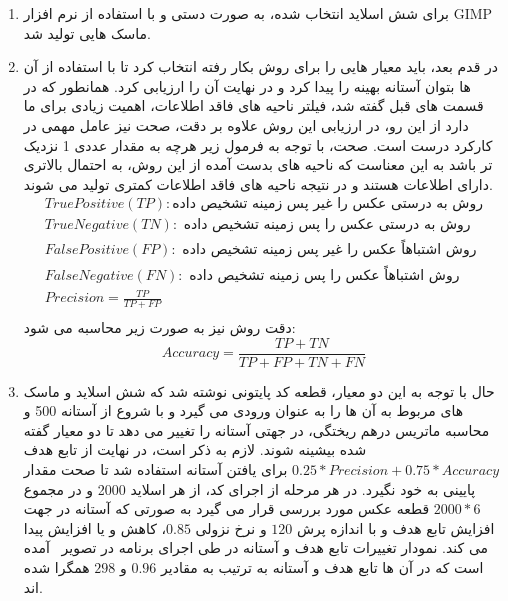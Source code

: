 \begin{enumerate}
    \item برای شش اسلاید انتخاب شده، به صورت دستی و با استفاده از نرم افزار GIMP ماسک هایی تولید شد.
    \item در قدم بعد، باید معیار هایی را برای روش بکار رفته انتخاب کرد تا با استفاده از آن ها بتوان آستانه بهینه را پیدا کرد و در نهایت آن را ارزیابی کرد.
    همانطور که در قسمت های قبل گفته شد، فیلتر ناحیه های فاقد اطلاعات، اهمیت زیادی برای ما دارد از این رو، در ارزیابی این روش علاوه بر دقت، صحت نیز عامل مهمی در کارکرد درست است.
    صحت، با توجه به فرمول زیر هرچه به مقدار عددی 1 نزدیک تر باشد به این معناست که ناحیه های بدست آمده از این روش، به احتمال بالاتری دارای اطلاعات هستند و در نتیجه ناحیه های فاقد اطلاعات کمتری تولید می شوند.
    \begin{gather*}
        TruePositive(TP) :\textit{روش به درستی عکس را غیر پس زمینه تشخیص داده}\\
        TrueNegative(TN) :\textit{ روش به درستی عکس را پس زمینه تشخیص داده}\\
        FalsePositive(FP) :\textit{ روش اشتباهاً عکس را غیر پس زمینه تشخیص داده}\\
        FalseNegative(FN) :\textit{ روش اشتباهاً عکس را پس زمینه تشخیص داده}\\
        Precision = \frac{TP}{TP + FP}\\
    \end{gather*}
    دقت روش نیز به صورت زیر محاسبه می شود:
    \[Accuracy = \frac{TP + TN}{TP + FP + TN + FN}\]
    \item حال با توجه به این دو معیار، قطعه کد پایتونی نوشته شد که شش اسلاید و ماسک های مربوط به آن ها را به عنوان ورودی می گیرد و با شروع از آستانه 500 و محاسبه ماتریس درهم ریختگی، در جهتی آستانه را تغییر می دهد تا دو معیار گفته شده بیشینه شوند.
    لازم به ذکر است، در نهایت از تابع هدف $0.25*Precision+0.75*Accuracy$ برای یافتن آستانه استفاده شد تا صحت مقدار پایینی به خود نگیرد.
    در هر مرحله از اجرای کد، از هر اسلاید 2000 و در مجموع $2000 * 6$ قطعه عکس مورد بررسی قرار می گیرد به صورتی که آستانه در جهت افزایش تابع هدف و با اندازه پرش $120$ و نرخ نزولی $0.85$، کاهش و یا افزایش پیدا می کند.
    نمودار تغییرات تابع هدف و آستانه در طی اجرای برنامه در تصویر~ آمده است که در آن ها تابع هدف و آستانه به ترتیب به مقادیر $0.96$ و $298$ همگرا شده اند.
    \begin{figure}
        \begin{center}

\end{center}
\end{figure}
\end{enumerate}
